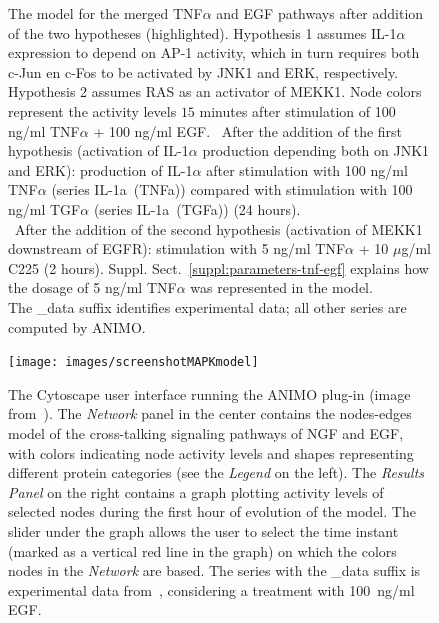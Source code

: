 \documentclass{bmcart}
\begin{document}
\begin{backmatter}
\begin{figure}[!tpb]
\begin{center}
\end{center}
\caption{\scriptsize
{\bf \protect{}} The model for the merged TNF$\alpha$ and EGF pathways
after addition of the two hypotheses (highlighted).
Hypothesis 1 assumes IL-1$\alpha$ expression to depend on AP-1 activity, which in turn requires
both c-Jun en c-Fos to be activated by JNK1 and ERK, respectively. Hypothesis 2 assumes RAS as an activator
of MEKK1. Node colors represent the activity levels $15$ minutes
after stimulation of 100 ng/ml TNF$\alpha$ + 100 ng/ml EGF.
{\bf \protect{}}~After the addition of the first hypothesis (activation of IL-1$\alpha$ production depending both
on JNK1 and ERK): production of IL-1$\alpha$ after stimulation with 100 ng/ml TNF$\alpha$ (series {\sf IL-1a~(TNFa)})
compared with stimulation with 100 ng/ml TGF$\alpha$ (series {\sf IL-1a~(TGFa)}) (24 hours).\\
{\bf \protect{}}~After the addition of the second hypothesis (activation of MEKK1 downstream of EGFR):
stimulation with 5 ng/ml TNF$\alpha$ + 10 $\mu$g/ml C225 (2 hours).
Suppl. Sect.~\ref{suppl:parameters-tnf-egf} explains how the dosage of 5 ng/ml TNF$\alpha$ was represented in the model.\\
The {\sf \_{}data} suffix identifies experimental data; all other series are computed by ANIMO.}\label{fig:large-model-graph}
\end{figure}



\begin{figure}[htbp]
\begin{center}
   \texttt{[image: images/screenshotMAPKmodel]}
\end{center}
\caption{The Cytoscape user interface running the ANIMO plug-in
(image from~\cite{animo-bibe}). The \emph{Network} panel in the center contains the nodes-edges
model of the cross-talking signaling pathways of NGF and EGF, with
colors indicating node activity levels and shapes representing different protein categories (see the \emph{Legend} on the left).
The \emph{Results Panel} on the right contains a graph plotting activity levels of selected nodes
during the first hour of evolution of the model. The slider under the graph
allows the user to select the time instant (marked as a vertical red line in the graph) on which
the colors nodes in the \emph{Network} are based.
The series with the {\sf \_data} suffix is experimental
data from~\cite{egf-ngf}, considering a treatment with 100~ng/ml EGF.
\label{fig:cytoscape}}
\end{figure}



\end{backmatter}
\end{document}

